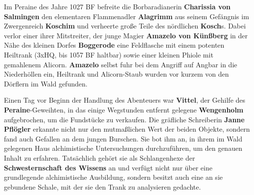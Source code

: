 
Im Peraine des Jahre 1027 BF befreite die Borbaradianerin \textbf{Charissia von Salmingen} den elementaren Flammenadler \textbf{Alagrimm} aus seinem Gefängnis im Zwergenreich \textbf{Koschim} und verheerte große Teile des nördlichen \textbf{Kosch}s.
Dabei verlor einer ihrer Mitstreiter, der junge Magier \textbf{Amazelo von Künßberg} in der Nähe des kleinen Dorfes \textbf{Boggerode} eine Feldflasche mit einem potenten Heiltrank (3xHQ, bis 1057 BF haltbar) sowie einer kleinen Phiole mit gemahlenem Alicorn.
\textbf{Amazelo} selbst fuhr bei dem Angriff auf Angbar in die Niederhöllen ein, Heiltrank und Alicorn-Staub wurden vor kurzem von den Dörflern im Wald gefunden.

Einen Tag vor Beginn der Handlung des Abenteuers war \textbf{Vittel}, der Gehilfe des \textbf{Peraine}-Geweihten, in das einige Wegstunden entfernt gelegene \textbf{Wengenholm} aufgebrochen, um die Fundstücke zu verkaufen.
Die gräfliche Schreiberin \textbf{Janne Pflögler} erkannte nicht nur den mutmaßlichen Wert der beiden Objekte, sondern fand auch Gefallen an dem jungen Burschen.
Sie bot ihm an, in ihrem im Wald gelegenen Haus alchimistische Untersuchungen durchzuführen, um den genauen Inhalt zu erfahren.
Tatsächlich gehört sie als Schlangenhexe der \textbf{Schwesternschaft des Wissens} an und verfügt nicht nur über eine grundlegende alchimistische Ausbildung, sondern besitzt auch eine an sie gebundene Schale, mit der sie den Trank zu analysieren gedachte.


